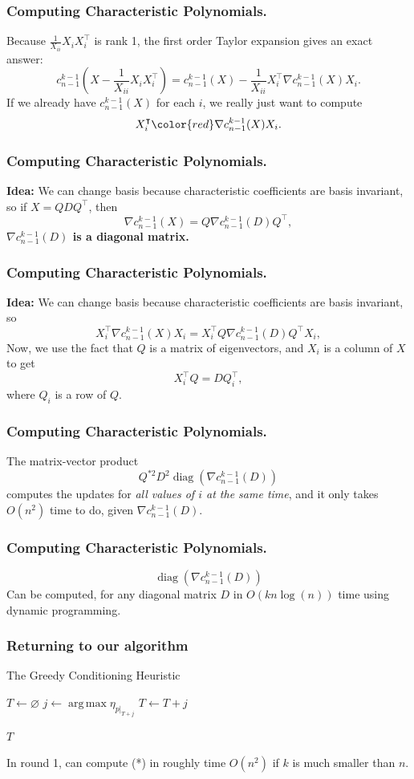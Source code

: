 \documentclass{beamer}
\DeclareMathOperator*{\argmax}{arg\,max}
\DeclareMathOperator*{\diag}{diag}
\begin{document}
\begin{frame}
    \frametitle{Computing Characteristic Polynomials.}
    Because $\frac{1}{X_{ii}}X_iX_i^{\intercal}$ is rank 1, the first order Taylor expansion gives an exact answer:
    \[
        c_{n-1}^{k-1}(X - \frac{1}{X_{ii}}X_iX_i^{\intercal}) = c_{n-1}^{k-1}(X)  - \frac{1}{X_{ii}}X_i^{\intercal}\nabla c_{n-1}^{k-1}(X)X_i.
    \]
    If we already have $c_{n-1}^{k-1}(X)$ for each $i$, we really just want to compute
    \[
        X_i^{\intercal}{\color{red}\nabla c_{n-1}^{k-1}(X)}X_i.
    \]
\end{frame}
\begin{frame}
    \frametitle{Computing Characteristic Polynomials.}
    \textbf{Idea:} We can change basis because characteristic coefficients are basis invariant, so if $X = QDQ^{\intercal}$, then
    \[
        \nabla c_{n-1}^{k-1}(X) = Q\nabla c_{n-1}^{k-1}(D)Q^{\intercal},
    \]
    \textbf{$\nabla c_{n-1}^{k-1}(D)$ is a diagonal matrix.}
\end{frame}
\begin{frame}
    \frametitle{Computing Characteristic Polynomials.}
    \textbf{Idea:} We can change basis because characteristic coefficients are basis invariant, so
    \[
        X_i^{\intercal}\nabla c_{n-1}^{k-1}(X)X_i = X_i^{\intercal}Q\nabla c_{n-1}^{k-1}(D)Q^{\intercal}X_i,
    \]
    \pause
    Now, we use the fact that $Q$ is a matrix of eigenvectors, and $X_i$ is a column of $X$ to get
    \[
        X_i^{\intercal}Q = DQ_i^{\intercal},
    \]
    where $Q_i$ is a row of $Q$.
\end{frame}
\begin{frame}
    \frametitle{Computing Characteristic Polynomials.}
    The matrix-vector product
    \[
        Q^{*2}D^2\diag(\nabla c_{n-1}^{k-1}(D))
    \]
    computes the updates for \emph{all values of $i$ at the same time}, and it only takes $O(n^2)$ time to do, given $\nabla c_{n-1}^{k-1}(D)$.
\end{frame}
\begin{frame}
    \frametitle{Computing Characteristic Polynomials.}
    \[
        \diag(\nabla c_{n-1}^{k-1}(D))
    \]
    Can be computed, for any diagonal matrix $D$ in $O(kn\log(n))$ time using dynamic programming.
\end{frame}
\begin{frame}
    \frametitle{Returning to our algorithm}
    \begin{algorithm}[H]
    \caption{The Greedy Conditioning Heuristic}
    \label{alg:greedy}
    \begin{algorithmic}
        \State $T \gets \varnothing$
            \State $j \gets \argmax \eta_{p|_{T + j}}$ \COMMENT{\textbf{(*)}}
            \State $T \gets T + j$
        \EndFor

        \Return $T$
    \end{algorithmic}
    \end{algorithm}
    In round 1, can compute (*) in roughly time $O(n^2)$ if $k$ is much smaller than $n$.
\end{frame}
\end{document}

